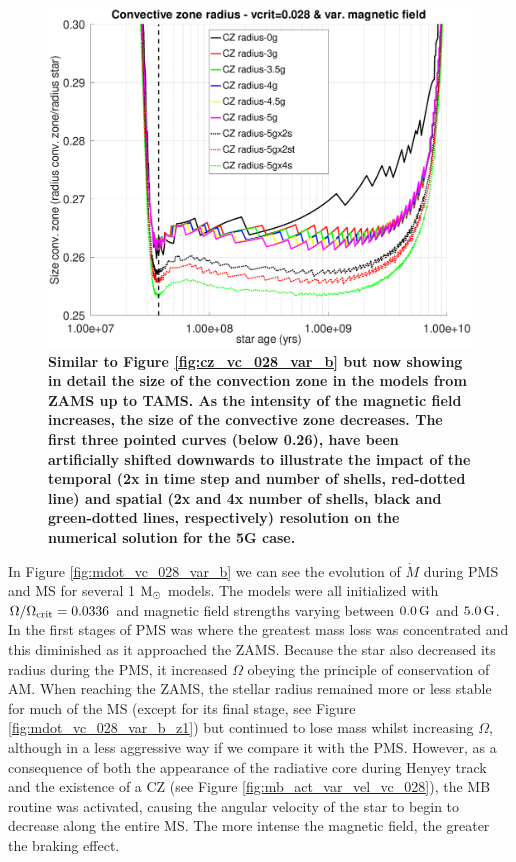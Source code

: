 \documentclass[fleqn,usenatbib]{mnras}
\begin{document}
\begin{figure}
	\includegraphics[trim = 15mm 10mm 15mm 10mm, clip,width=\columnwidth]{figures/cz_vc_028_var_g_z1_new.eps}
    \caption{\textbf{Similar to Figure \ref{fig:cz_vc_028_var_b} but now showing in detail the size of the convection zone in the models from ZAMS up to TAMS. As the intensity of the magnetic field increases, the size of the convective zone decreases. The first three pointed curves (below 0.26), have been artificially shifted downwards to illustrate the impact of the temporal (2x in time step and number of shells, red-dotted line) and spatial (2x and 4x number of shells, black and green-dotted lines, respectively) resolution on the numerical solution for the 5G case.}}
    \label{fig:cz_vc_028_var_b_z1_new}
\end{figure}


In Figure \ref{fig:mdot_vc_028_var_b} we can see the evolution of $\Dot{M}$ during PMS and MS for several 1 $\mathrm{M}_\odot$ models. The models were all initialized with $\Omega / \Omega_{\mathrm{crit}}=0.0336$ and magnetic field strengths varying between $0.0\,\mathrm{G}$ and $5.0\,\mathrm{G}$. In the first stages of PMS was where the greatest mass loss was concentrated and this diminished as it approached the ZAMS. Because the star also decreased its radius during the PMS, it increased $\Omega$ obeying the principle of conservation of AM. When reaching the ZAMS, the stellar radius remained more or less stable for much of the MS (except for its final stage, see Figure \ref{fig:mdot_vc_028_var_b_z1}) but continued to lose mass whilst increasing $\Omega$, although in a less aggressive way if we compare it with the PMS. However, as a consequence of both the appearance of the radiative core during Henyey track and the existence of a CZ (see Figure \ref{fig:mb_act_var_vel_vc_028}), the MB routine was activated, causing the angular velocity of the star to begin to decrease along the entire MS. The more intense the magnetic field, the greater the braking effect.\par 
\end{document}
